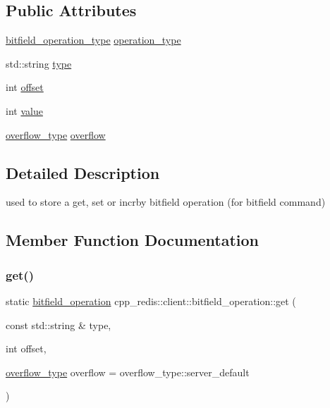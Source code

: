 \subsection*{Public Attributes}
\begin{DoxyCompactItemize}
\item 
\hyperlink{classcpp__redis_1_1client_a2e2023534299541da0a659802e2f087d}{bitfield\+\_\+operation\+\_\+type} \hyperlink{structcpp__redis_1_1client_1_1bitfield__operation_a4f3462e48d5f01b6fcd1605d6de21a3e}{operation\+\_\+type}
\item 
std\+::string \hyperlink{structcpp__redis_1_1client_1_1bitfield__operation_adbbf30e5138d0524940d536b2bc71480}{type}
\item 
int \hyperlink{structcpp__redis_1_1client_1_1bitfield__operation_a8a4e83ddbac5c3500c6960f54e736598}{offset}
\item 
int \hyperlink{structcpp__redis_1_1client_1_1bitfield__operation_a8104441f6b9ee7cbf5e6ee6c17c7445c}{value}
\item 
\hyperlink{classcpp__redis_1_1client_a4119182ad3a01c1bb626a174375e114a}{overflow\+\_\+type} \hyperlink{structcpp__redis_1_1client_1_1bitfield__operation_a2f478e17655a249080178034faa0f6f2}{overflow}
\end{DoxyCompactItemize}


\subsection{Detailed Description}
used to store a get, set or incrby bitfield operation (for bitfield command) 

\subsection{Member Function Documentation}
\mbox{\label{structcpp__redis_1_1client_1_1bitfield__operation_a93d3f7ab6b6bae82ac209bb49374d788}} 
\subsubsection{\texorpdfstring{get()}{get()}}
{\footnotesize\ttfamily static \hyperlink{structcpp__redis_1_1client_1_1bitfield__operation}{bitfield\+\_\+operation} cpp\+\_\+redis\+::client\+::bitfield\+\_\+operation\+::get (\begin{DoxyParamCaption}\item[{const std\+::string \&}]{type,  }\item[{int}]{offset,  }\item[{\hyperlink{classcpp__redis_1_1client_a4119182ad3a01c1bb626a174375e114a}{overflow\+\_\+type}}]{overflow = {\ttfamily overflow\+\_\+type\+:\+:server\+\_\+default} }\end{DoxyParamCaption})\hspace{0.3cm}{\ttfamily [static]}}

